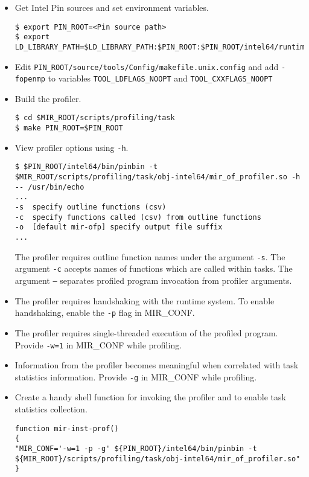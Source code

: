 \documentclass[11pt,a4paper]{article}
\begin{document}
\begin{itemize}
\item Get Intel Pin sources and set environment variables.

\begin{lstlisting}[style=MyInputStyle]
$ export PIN_ROOT=<Pin source path>
$ export LD_LIBRARY_PATH=$LD_LIBRARY_PATH:$PIN_ROOT:$PIN_ROOT/intel64/runtime
\end{lstlisting}

\item Edit \texttt{PIN\_ROOT/source/tools/Config/makefile.unix.config} and add \texttt{-fopenmp} to variables \texttt{TOOL\_LDFLAGS\_NOOPT}  and \texttt{TOOL\_CXXFLAGS\_NOOPT}

\item Build the profiler.

\begin{lstlisting}[style=MyInputStyle]
$ cd $MIR_ROOT/scripts/profiling/task
$ make PIN_ROOT=$PIN_ROOT
\end{lstlisting}

\item View profiler options using \texttt{-h}.

\begin{lstlisting}[style=MyInputStyle]
$ $PIN_ROOT/intel64/bin/pinbin -t $MIR_ROOT/scripts/profiling/task/obj-intel64/mir_of_profiler.so -h -- /usr/bin/echo
...
-s  specify outline functions (csv)
-c  specify functions called (csv) from outline functions
-o  [default mir-ofp] specify output file suffix
...
\end{lstlisting}

The profiler requires outline function names under the argument \texttt{-s}. The argument \texttt{-c} accepts names of functions which are called within tasks. The argument \texttt{--} separates profiled program invocation from profiler arguments.

\item The profiler requires handshaking with the runtime system. To enable handshaking, enable the \texttt{-p} flag in MIR\_CONF.

\item The profiler requires single-threaded execution of the profiled program. Provide \texttt{-w=1} in MIR\_CONF while profiling.

\item Information from the profiler becomes meaningful when correlated with task statistics information. Provide \texttt{-g} in MIR\_CONF while profiling.

\item Create a handy shell function for invoking the profiler and to enable task statistics collection.
  
\begin{lstlisting}[style=MyInputStyle]
function mir-inst-prof()
{
"MIR_CONF='-w=1 -p -g' ${PIN_ROOT}/intel64/bin/pinbin -t ${MIR_ROOT}/scripts/profiling/task/obj-intel64/mir_of_profiler.so"
}
\end{lstlisting}
\end{itemize}
\end{document}
